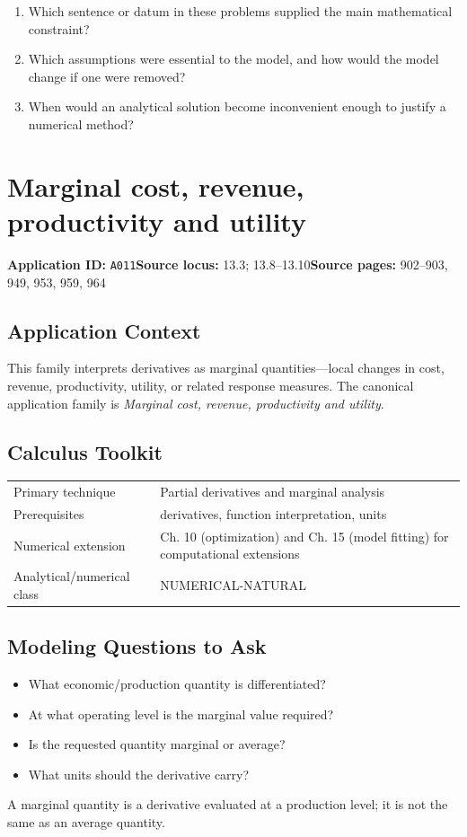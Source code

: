 \documentclass[11pt]{book}
\newcommand{\pid}[1]{\texttt{#1}}
\begin{document}
\begin{reflectionbox}\begin{enumerate}
\item Which sentence or datum in these problems supplied the main mathematical constraint?
\item Which assumptions were essential to the model, and how would the model change if one were removed?
\item When would an analytical solution become inconvenient enough to justify a numerical method?
\end{enumerate}\end{reflectionbox}
\chapter{Marginal cost, revenue, productivity and utility}\label{app:A011}
\textbf{Application ID:} \pid{A011}\quad \textbf{Source locus:} 13.3; 13.8–13.10\quad \textbf{Source pages:} 902–903, 949, 953, 959, 964
\section*{Application Context}
This family interprets derivatives as marginal quantities—local changes in cost, revenue, productivity, utility, or related response measures. The canonical application family is \emph{Marginal cost, revenue, productivity and utility}.
\section*{Calculus Toolkit}
\begin{tabularx}{\textwidth}{@{}lX@{}}\toprule
Primary technique & Partial derivatives and marginal analysis \\
Prerequisites & derivatives, function interpretation, units \\
Numerical extension & Ch. 10 (optimization) and Ch. 15 (model fitting) for computational extensions \\
Analytical/numerical class & NUMERICAL-NATURAL \\
\bottomrule\end{tabularx}
\section*{Modeling Questions to Ask}\begin{itemize}
\item What economic/production quantity is differentiated?
\item At what operating level is the marginal value required?
\item Is the requested quantity marginal or average?
\item What units should the derivative carry?
\end{itemize}
\begin{errorbox}A marginal quantity is a derivative evaluated at a production level; it is not the same as an average quantity.\end{errorbox}
\end{document}
